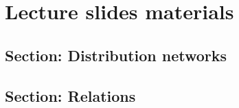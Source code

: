 
\section{Lecture slides materials}

\subsection{Section: Distribution networks}

\subsection{Section: Relations}

\begin{forslides}


\end{forslides}
